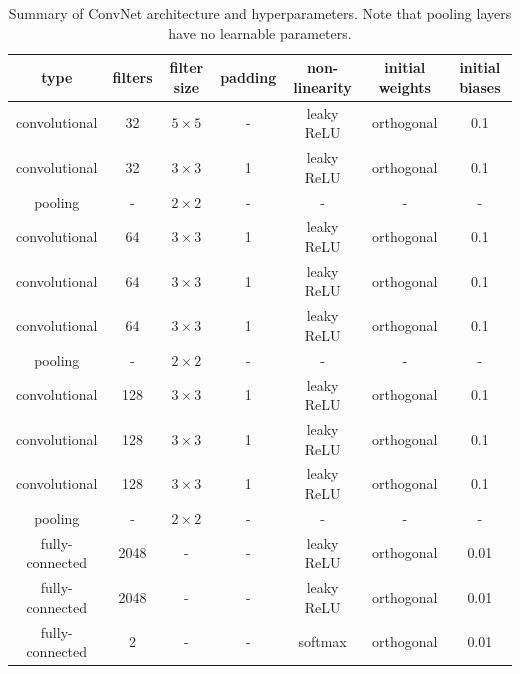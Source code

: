 \documentclass[fleqn,usenatbib]{mnras}
\begin{document}
\begin{table}
  \centering
  \caption{Summary of ConvNet architecture and hyperparameters. Note that pooling layers have no learnable parameters.}
  \label{table:hyperparamters}
  \begin{tabular}{ccccccc}
    \hline
    type            & filters & filter size & padding & non-linearity & initial weights & initial biases \\
    \hline
    convolutional   & 32          & $5\times5$  & -       & leaky ReLU    & orthogonal      & 0.1            \\
    convolutional   & 32          & $3\times3$  & 1       & leaky ReLU    & orthogonal      & 0.1            \\
    pooling         & -           & $2\times2$  & -       & -             & -               & -              \\
    convolutional   & 64          & $3\times3$  & 1       & leaky ReLU    & orthogonal      & 0.1            \\
    convolutional   & 64          & $3\times3$  & 1       & leaky ReLU    & orthogonal      & 0.1            \\
    convolutional   & 64          & $3\times3$  & 1       & leaky ReLU    & orthogonal      & 0.1            \\
    pooling         & -           & $2\times2$  & -       & -             & -               & -              \\
    convolutional   & 128         & $3\times3$  & 1       & leaky ReLU    & orthogonal      & 0.1            \\
    convolutional   & 128         & $3\times3$  & 1       & leaky ReLU    & orthogonal      & 0.1            \\
    convolutional   & 128         & $3\times3$  & 1       & leaky ReLU    & orthogonal      & 0.1            \\
    pooling         & -           & $2\times2$  & -       & -             & -               & -              \\
    fully-connected & 2048        & -           & -       & leaky ReLU    & orthogonal      & 0.01            \\
    fully-connected & 2048        & -           & -       & leaky ReLU    & orthogonal      & 0.01            \\
    fully-connected & 2           & -           & -       & softmax       & orthogonal      & 0.01            \\
    \hline
  \end{tabular}
\end{table}
\end{document}
